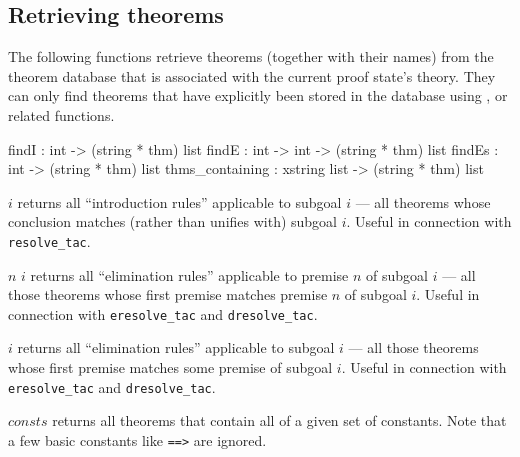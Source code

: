 \subsection{Retrieving theorems}

The following functions retrieve theorems (together with their names)
from the theorem database that is associated with the current proof
state's theory.  They can only find theorems that have explicitly been
stored in the database using ,  or
related functions.
\begin{ttbox} 
findI           :          int -> (string * thm) list
findE           :   int -> int -> (string * thm) list
findEs          :          int -> (string * thm) list
thms_containing : xstring list -> (string * thm) list
\end{ttbox}
\begin{ttdescription}
\item[\ttindexbold{findI} $i$]
  returns all ``introduction rules'' applicable to subgoal $i$ --- all
  theorems whose conclusion matches (rather than unifies with) subgoal
  $i$.  Useful in connection with {\tt resolve_tac}.

\item[\ttindexbold{findE} $n$ $i$] returns all ``elimination rules''
  applicable to premise $n$ of subgoal $i$ --- all those theorems whose
  first premise matches premise $n$ of subgoal $i$.  Useful in connection with
  {\tt eresolve_tac} and {\tt dresolve_tac}.

\item[\ttindexbold{findEs} $i$] returns all ``elimination rules'' applicable
  to subgoal $i$ --- all those theorems whose first premise matches some
  premise of subgoal $i$.  Useful in connection with {\tt eresolve_tac} and
  {\tt dresolve_tac}.
  
\item[\ttindexbold{thms_containing} $consts$] returns all theorems
  that contain all of a given set of constants.  Note that a few basic
  constants like \verb$==>$ are ignored.
\end{ttdescription}


